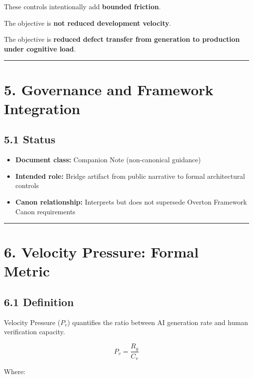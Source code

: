 \documentclass[
]{article}
\providecommand{\tightlist}{%
  \setlength{\itemsep}{0pt}\setlength{\parskip}{0pt}}
\begin{document}
These controls intentionally add \textbf{bounded friction}.

The objective is \textbf{not reduced development velocity}.

The objective is \textbf{reduced defect transfer from generation to
production under cognitive load}.

\begin{center}\rule{0.5\linewidth}{0.5pt}\end{center}

\section{5. Governance and Framework
Integration}\label{5-governance-and-framework-integration}

\subsection{5.1 Status}\label{51-status}

\begin{itemize}
\tightlist
\item
  \textbf{Document class:} Companion Note (non-canonical guidance)
\item
  \textbf{Intended role:} Bridge artifact from public narrative to
  formal architectural controls
\item
  \textbf{Canon relationship:} Interprets but does not supersede Overton
  Framework Canon requirements
\end{itemize}

\begin{center}\rule{0.5\linewidth}{0.5pt}\end{center}

\section{6. Velocity Pressure: Formal
Metric}\label{6-velocity-pressure-formal-metric}

\subsection{6.1 Definition}\label{61-definition}

Velocity Pressure (\(P_v\)) quantifies the ratio between AI generation
rate and human verification capacity.

\[
P_v = \frac{R_g}{C_v}
\]

Where:
\end{document}
